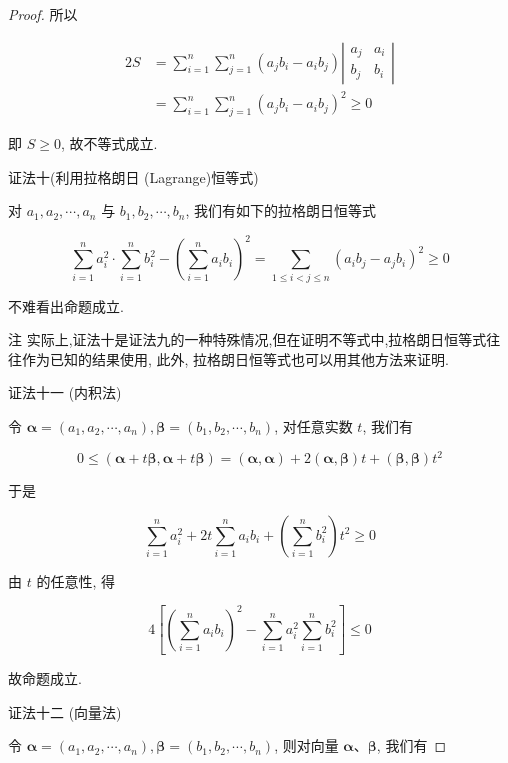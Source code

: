 \begin{proof}
	所以
	
	$$
	\begin{aligned}
	2 S & =\sum_{i=1}^{n} \sum_{j=1}^{n}\left(a_{j} b_{i}-a_{i} b_{j}\right)\left|\begin{array}{ll}
	a_{j} & a_{i} \\
	b_{j} & b_{i}
	\end{array}\right| \\
	& =\sum_{i=1}^{n} \sum_{j=1}^{n}\left(a_{j} b_{i}-a_{i} b_{j}\right)^{2} \geqslant 0
	\end{aligned}
	$$
	
	即 $S \geqslant 0$, 故不等式成立.
	
	证法十(利用拉格朗日 (Lagrange)恒等式)
	
	对 $a_{1}, a_{2}, \cdots, a_{n}$ 与 $b_{1}, b_{2}, \cdots, b_{n}$, 我们有如下的拉格朗日恒等式
	
	$$
	\sum_{i=1}^{n} a_{i}^{2} \cdot \sum_{i=1}^{n} b_{i}^{2}-\left(\sum_{i=1}^{n} a_{i} b_{i}\right)^{2}=\sum_{1 \leqslant i<j \leqslant n}\left(a_{i} b_{j}-a_{j} b_{i}\right)^{2} \geqslant 0
	$$
	
	不难看出命题成立.
	
	注 实际上,证法十是证法九的一种特殊情况,但在证明不等式中,拉格朗日恒等式往往作为已知的结果使用, 此外, 拉格朗日恒等式也可以用其他方法来证明.
	
	证法十一 (内积法)
	
	令 $\boldsymbol{\alpha}=\left(a_{1}, a_{2}, \cdots, a_{n}\right), \boldsymbol{\beta}=\left(b_{1}, b_{2}, \cdots, b_{n}\right)$, 对任意实数 $t$, 我们有
	
	$$
	0 \leqslant(\boldsymbol{\alpha}+t \boldsymbol{\beta}, \boldsymbol{\alpha}+t \boldsymbol{\beta})=(\boldsymbol{\alpha}, \boldsymbol{\alpha})+2(\boldsymbol{\alpha}, \boldsymbol{\beta}) t+(\boldsymbol{\beta}, \boldsymbol{\beta}) t^{2}
	$$
	
	于是
	
	$$
	\sum_{i=1}^{n} a_{i}^{2}+2 t \sum_{i=1}^{n} a_{i} b_{i}+\left(\sum_{i=1}^{n} b_{i}^{2}\right) t^{2} \geqslant 0
	$$
	
	由 $t$ 的任意性, 得
	
	$$
	4\left[\left(\sum_{i=1}^{n} a_{i} b_{i}\right)^{2}-\sum_{i=1}^{n} a_{i}^{2} \sum_{i=1}^{n} b_{i}^{2}\right] \leqslant 0
	$$
	
	故命题成立.
	
	证法十二 (向量法)
	
	令 $\boldsymbol{\alpha}=\left(a_{1}, a_{2}, \cdots, a_{n}\right), \boldsymbol{\beta}=\left(b_{1}, b_{2}, \cdots, b_{n}\right)$, 则对向量 $\boldsymbol{\alpha} 、 \boldsymbol{\beta}$, 我们有
	

\end{proof}
